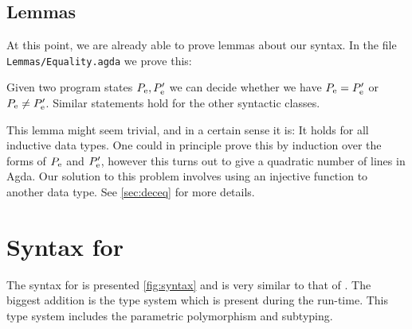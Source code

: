 \subsection{Lemmas}

At this point, we are already able to prove lemmas about our syntax. In the file
\texttt{Lemmas/Equality.agda} we prove this:

\begin{lemma}
  Given two program states $P_{\mathrm{e}}, P'_{\mathrm{e}}$ we can decide whether we
  have $P_{\mathrm{e}} = P'_{\mathrm{e}}$ or $P_{\mathrm{e}} \neq P'_{\mathrm{e}}$. Similar
  statements hold for the other syntactic classes.
\end{lemma}

This lemma might seem trivial, and in a certain sense it is: It holds for all
inductive data types. One could in principle prove this by induction over the
forms of $P_{\mathrm{e}}$ and $P'_{\mathrm{e}}$, however this turns out to give a
quadratic number of lines in Agda. Our solution to this problem involves using
an injective function to another data type. See \cref{sec:deceq} for more
details.

\section{Syntax for \ATAL}

The syntax for \ATAL is presented \cref{fig:syntax} and is very similar to that
of \ATALe. The biggest addition is the type system which is present during the
run-time. This type system includes the parametric polymorphism and subtyping.


